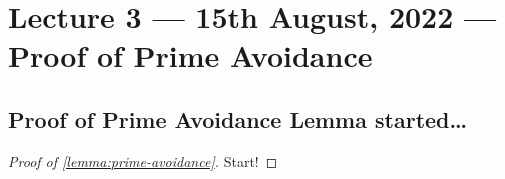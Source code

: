 \section{Lecture 3 --- 15th August, 2022 --- Proof of Prime Avoidance}
\subsection{Proof of Prime Avoidance Lemma started\dots}
\begin{proof}[Proof of \ref{lemma:prime-avoidance}]
    Start! 
\end{proof}
